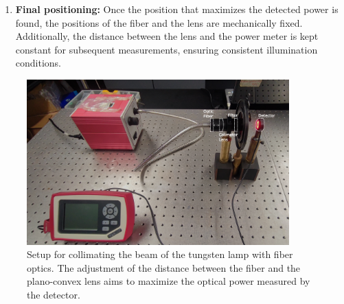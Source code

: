 \begin{enumerate}
\begin{itemize}
            \item Instead, an optical power meter is positioned at a fixed distance from the collimating lens (see Figure~\ref{fig:montaje_colimacion}).
            \item A bandpass filter with the narrowest possible bandwidth is placed to approximate the output to a quasi-monochromatic source. In this experiment, a filter centered at 633 nm with a bandwidth of 4 nm was used. This allows the optical powermeter to be configured with a well-defined central wavelength, a necessary condition for obtaining an accurate measurement of the transmitted power.
            \item The distance between the fiber and the lens is varied around the nominal focal length (25\,mm), seeking the maximum optical power measured at the detector. This point corresponds to the configuration with minimal beam divergence near the measurement plane and maximum power collection. Additionally, care is taken to ensure that the entire area of the detector is fully illuminated by the beam, as this is a necessary condition for obtaining an accurate irradiance measurement based on the illuminated area of the detector, which, in the case of complete illumination, corresponds to the total detector area.
    \end{itemize}
    
    \item \textbf{Final positioning:} Once the position that maximizes the detected power is found, the positions of the fiber and the lens are mechanically fixed. Additionally, the distance between the lens and the power meter is kept constant for subsequent measurements, ensuring consistent illumination conditions.
\end{enumerate}

\begin{figure}[h!]
    \centering
    \includegraphics[trim=30mm 0mm 30mm 25mm, clip, width=0.9\textwidth]{Figures/C3/colimacion.pdf}
    \caption{Setup for collimating the beam of the tungsten lamp with fiber optics. The adjustment of the distance between the fiber and the plano-convex lens aims to maximize the optical power measured by the detector.}
    \label{fig:montaje_colimacion}
\end{figure}

